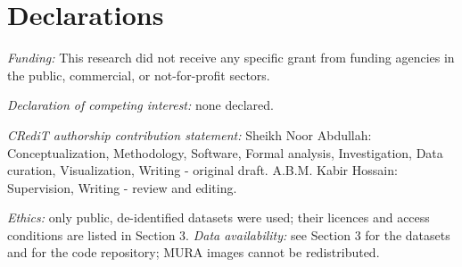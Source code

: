 \section{Declarations}
\emph{Funding:} This research did not receive any specific grant from funding agencies in the public, commercial, or not-for-profit sectors.

\emph{Declaration of competing interest:} none declared.

\emph{CRediT authorship contribution statement:} Sheikh Noor Abdullah: Conceptualization, Methodology, Software, Formal analysis, Investigation, Data curation, Visualization, Writing - original draft. A.B.M. Kabir Hossain: Supervision, Writing - review and editing.

\emph{Ethics:} only public, de-identified datasets were used; their licences and access conditions are listed in Section 3. \emph{Data availability:} see Section 3 for the datasets and for the code repository; MURA images cannot be redistributed.


